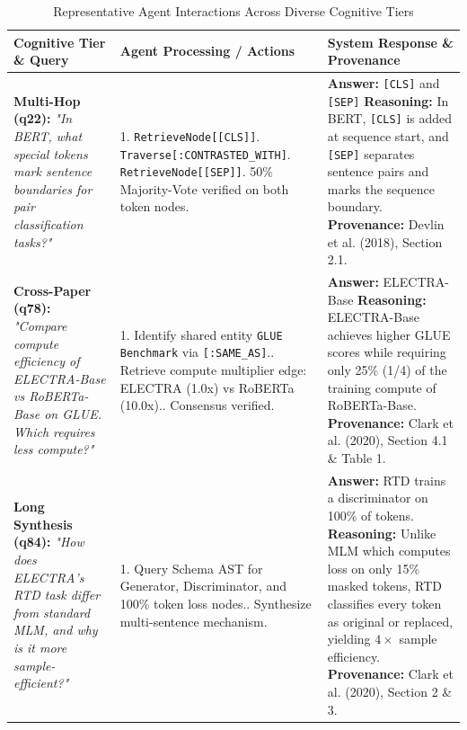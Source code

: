 \documentclass[12pt,a4paper,oneside]{report}
\begin{document}
\begin{table}[h]
\centering
\caption{Representative Agent Interactions Across Diverse Cognitive Tiers}
\label{tab:agent_interaction}
\small
\begin{tabular}{p{3.2cm}p{4.8cm}p{6.0cm}}
\toprule
\textbf{Cognitive Tier \& Query} & \textbf{Agent Processing / Actions} & \textbf{System Response \& Provenance} \\
\midrule
\textbf{Multi-Hop (q22):}\newline
\textit{"In BERT, what special tokens mark sentence boundaries for pair classification tasks?"} &
1. \texttt{RetrieveNode[[CLS]]}\newline
2. \texttt{Traverse[:CONTRASTED\_WITH]}\newline
3. \texttt{RetrieveNode[[SEP]]}\newline
4. 50\% Majority-Vote verified on both token nodes. &
\textbf{Answer:} \texttt{[CLS]} and \texttt{[SEP]}\newline
\textbf{Reasoning:} In BERT, \texttt{[CLS]} is added at sequence start, and \texttt{[SEP]} separates sentence pairs and marks the sequence boundary.\newline
\textbf{Provenance:} Devlin et al. (2018), Section 2.1. \\
\midrule
\textbf{Cross-Paper (q78):}\newline
\textit{"Compare compute efficiency of ELECTRA-Base vs RoBERTa-Base on GLUE. Which requires less compute?"} &
1. Identify shared entity \texttt{GLUE Benchmark} via \texttt{[:SAME\_AS]}.\newline
2. Retrieve compute multiplier edge: ELECTRA (1.0x) vs RoBERTa (10.0x).\newline
3. Consensus verified. &
\textbf{Answer:} ELECTRA-Base\newline
\textbf{Reasoning:} ELECTRA-Base achieves higher GLUE scores while requiring only 25\% (1/4) of the training compute of RoBERTa-Base.\newline
\textbf{Provenance:} Clark et al. (2020), Section 4.1 \& Table 1. \\
\midrule
\textbf{Long Synthesis (q84):}\newline
\textit{"How does ELECTRA's RTD task differ from standard MLM, and why is it more sample-efficient?"} &
1. Query Schema AST for Generator, Discriminator, and 100\% token loss nodes.\newline
2. Synthesize multi-sentence mechanism. &
\textbf{Answer:} RTD trains a discriminator on 100\% of tokens.\newline
\textbf{Reasoning:} Unlike MLM which computes loss on only 15\% masked tokens, RTD classifies every token as original or replaced, yielding $4\times$ sample efficiency.\newline
\textbf{Provenance:} Clark et al. (2020), Section 2 \& 3. \\
\bottomrule
\end{tabular}
\end{table}
\end{document}
